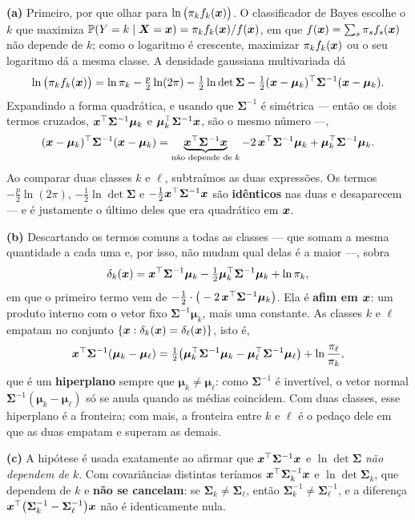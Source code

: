 \documentclass[11pt,a4paper]{article}
\begin{document}
\begin{solucao}
\textbf{(a)} Primeiro, por que olhar para $\ln\big(\pi_k f_k(\bm{x})\big)$. O
classificador de Bayes escolhe o $k$ que maximiza
$\mathbb{P}(Y=k\mid\bm{X}=\bm{x})=\pi_k f_k(\bm{x})/f(\bm{x})$, em que $f(\bm{x})=\sum_s\pi_s f_s(\bm{x})$ não
depende de $k$; como o logaritmo é crescente, maximizar $\pi_k f_k(\bm{x})$ ou o seu
logaritmo dá a mesma classe. A densidade gaussiana multivariada dá
\[
  \ln\big(\pi_k f_k(\bm{x})\big)
  = \ln\pi_k - \tfrac{p}{2}\ln(2\pi) - \tfrac12\ln\det\bm\Sigma
    - \tfrac12(\bm{x}-\bm\mu_k)^\top\bm\Sigma^{-1}(\bm{x}-\bm\mu_k).
\]
Expandindo a forma quadrática, e usando que $\bm\Sigma^{-1}$ é simétrica --- então
os dois termos cruzados, $\bm{x}^\top\bm\Sigma^{-1}\bm\mu_k$ e
$\bm\mu_k^\top\bm\Sigma^{-1}\bm{x}$, são o mesmo número ---,
\[
  (\bm{x}-\bm\mu_k)^\top\bm\Sigma^{-1}(\bm{x}-\bm\mu_k)
  = \underbrace{\bm{x}^\top\bm\Sigma^{-1}\bm{x}}_{\text{não depende de }k}
    - 2\,\bm{x}^\top\bm\Sigma^{-1}\bm\mu_k
    + \bm\mu_k^\top\bm\Sigma^{-1}\bm\mu_k .
\]
Ao comparar duas classes $k$ e $\ell$, subtraímos as duas expressões. Os termos
$-\tfrac p2\ln(2\pi)$, $-\tfrac12\ln\det\bm\Sigma$ e
$-\tfrac12\bm{x}^\top\bm\Sigma^{-1}\bm{x}$ são \textbf{idênticos} nas duas e desaparecem
--- e é justamente o último deles que era quadrático em $\bm{x}$.

\smallskip
\textbf{(b)} Descartando os termos comuns a todas as classes --- que somam a mesma
quantidade a cada uma e, por isso, não mudam qual delas é a maior ---, sobra
\[
  \delta_k(\bm{x}) = \bm{x}^\top\bm\Sigma^{-1}\bm\mu_k
    - \tfrac12\bm\mu_k^\top\bm\Sigma^{-1}\bm\mu_k + \ln\pi_k ,
\]
em que o primeiro termo vem de
$-\tfrac12\cdot\big(-2\,\bm{x}^\top\bm\Sigma^{-1}\bm\mu_k\big)$. Ela é \textbf{afim em
$\bm{x}$}: um produto interno com o vetor fixo $\bm\Sigma^{-1}\bm\mu_k$, mais uma
constante. As classes $k$ e $\ell$ empatam no conjunto
$\{\bm{x}: \delta_k(\bm{x})=\delta_\ell(\bm{x})\}$, isto é,
\[
  \bm{x}^\top\bm\Sigma^{-1}(\bm\mu_k-\bm\mu_\ell)
  = \tfrac12\big(\bm\mu_k^\top\bm\Sigma^{-1}\bm\mu_k
    - \bm\mu_\ell^\top\bm\Sigma^{-1}\bm\mu_\ell\big) + \ln\frac{\pi_\ell}{\pi_k},
\]
que é um \textbf{hiperplano} sempre que $\bm\mu_k\ne\bm\mu_\ell$: como
$\bm\Sigma^{-1}$ é invertível, o vetor normal $\bm\Sigma^{-1}(\bm\mu_k-\bm\mu_\ell)$
só se anula quando as médias coincidem. Com duas classes, esse hiperplano é a
fronteira; com mais, a fronteira entre $k$ e $\ell$ é o pedaço dele em que as duas
empatam e superam as demais.

\smallskip
\textbf{(c)} A hipótese é usada exatamente ao afirmar que
$\bm{x}^\top\bm\Sigma^{-1}\bm{x}$ e $\ln\det\bm\Sigma$ \emph{não dependem de $k$}. Com
covariâncias distintas teríamos $\bm{x}^\top\bm\Sigma_k^{-1}\bm{x}$ e
$\ln\det\bm\Sigma_k$, que dependem de $k$ e \textbf{não se cancelam}: se
$\bm\Sigma_k\ne\bm\Sigma_\ell$, então $\bm\Sigma_k^{-1}\ne\bm\Sigma_\ell^{-1}$, e a
diferença $\bm{x}^\top\big(\bm\Sigma_k^{-1}-\bm\Sigma_\ell^{-1}\big)\bm{x}$ não é
identicamente nula.


\end{solucao}
\end{document}
